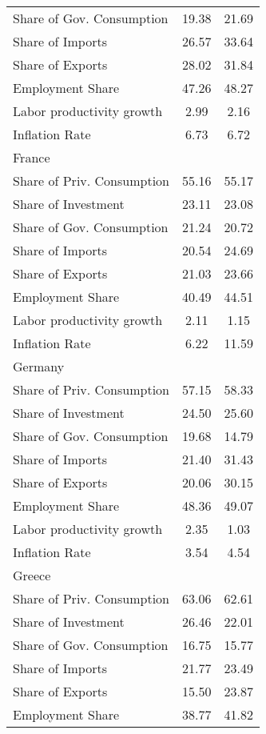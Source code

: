 \begin{center}
\begin{longtable}{lcc}
Share of Gov. Consumption &     19.38 &     21.69 \\  
Share of Imports &     26.57 &     33.64 \\  
Share of Exports &     28.02 &     31.84 \\  
Employment Share &     47.26 &     48.27 \\  
Labor productivity growth &      2.99 &      2.16 \\  
Inflation Rate &      6.73 &      6.72 \\  
France &  &  \\  
Share of Priv. Consumption &     55.16 &     55.17 \\  
Share of Investment &     23.11 &     23.08 \\  
Share of Gov. Consumption &     21.24 &     20.72 \\  
Share of Imports &     20.54 &     24.69 \\  
Share of Exports &     21.03 &     23.66 \\  
Employment Share &     40.49 &     44.51 \\  
Labor productivity growth &      2.11 &      1.15 \\  
Inflation Rate &      6.22 &     11.59 \\  
Germany &  &  \\  
Share of Priv. Consumption &     57.15 &     58.33 \\  
Share of Investment &     24.50 &     25.60 \\  
Share of Gov. Consumption &     19.68 &     14.79 \\  
Share of Imports &     21.40 &     31.43 \\  
Share of Exports &     20.06 &     30.15 \\  
Employment Share &     48.36 &     49.07 \\  
Labor productivity growth &      2.35 &      1.03 \\  
Inflation Rate &      3.54 &      4.54 \\  
Greece &  &  \\  
Share of Priv. Consumption &     63.06 &     62.61 \\  
Share of Investment &     26.46 &     22.01 \\  
Share of Gov. Consumption &     16.75 &     15.77 \\  
Share of Imports &     21.77 &     23.49 \\  
Share of Exports &     15.50 &     23.87 \\  
Employment Share &     38.77 &     41.82 \\  

\end{longtable}
\end{center}
